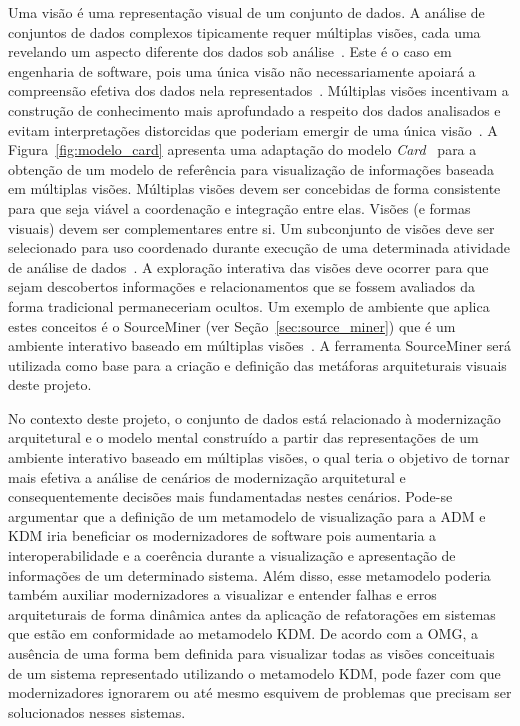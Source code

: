 \documentclass[12pt]{article}
\begin{document}
Uma visão é uma representação visual de um conjunto de dados. A análise de conjuntos de dados complexos tipicamente requer múltiplas visões, cada uma revelando um aspecto diferente dos dados sob análise~\cite{Boukhelifa_2003}. Este é o caso em engenharia de software, pois uma única visão não necessariamente apoiará a compreensão efetiva dos dados nela representados~\cite{Storey_2006}. Múltiplas visões incentivam a construção de conhecimento mais aprofundado a respeito dos dados analisados e evitam interpretações distorcidas que poderiam emergir de uma única visão~\cite{Ainsworth_1999}. A Figura~\ref{fig:modelo_card} apresenta uma adaptação do modelo \textit{Card}~\cite{source_miner_glauco} para a obtenção de um modelo de referência para visualização de informações baseada em múltiplas visões. Múltiplas visões devem ser concebidas de forma consistente para que seja viável a coordenação e integração entre elas. Visões (e formas visuais) devem ser complementares entre si. Um subconjunto de visões deve ser selecionado para uso coordenado durante execução de uma determinada atividade de análise de dados~\cite{WangBaldonado_2000}. A exploração interativa das visões deve ocorrer para que sejam descobertos informações e relacionamentos que se fossem avaliados da forma tradicional permaneceriam ocultos. Um exemplo de ambiente que aplica estes conceitos é o SourceMiner (ver Seção~\ref{sec:source_miner}) que é um ambiente interativo baseado em múltiplas visões~\cite{source_miner_glauco}. A ferramenta  SourceMiner será utilizada como base para a criação e definição das metáforas arquiteturais visuais deste projeto. 

No contexto deste projeto, o conjunto de dados está relacionado à modernização arquitetural e o modelo mental construído a partir das representações de um ambiente interativo baseado em múltiplas visões, o qual teria o objetivo de tornar mais efetiva a análise de cenários de modernização arquitetural e consequentemente decisões mais fundamentadas nestes cenários. Pode-se argumentar que a definição de um metamodelo de visualização para a ADM e KDM iria beneficiar os modernizadores de software pois aumentaria a interoperabilidade e a coerência durante a visualização e apresentação de informações de um determinado sistema. Além disso, esse metamodelo poderia também auxiliar modernizadores a visualizar e entender falhas e erros arquiteturais de forma dinâmica antes da aplicação de refatorações em sistemas que estão em conformidade ao metamodelo KDM. De acordo com a OMG, a ausência de uma forma bem definida para visualizar todas as visões conceituais de um sistema representado utilizando o metamodelo KDM, pode fazer com que modernizadores ignorarem ou até mesmo esquivem de problemas que precisam ser solucionados nesses sistemas. 
\end{document}
